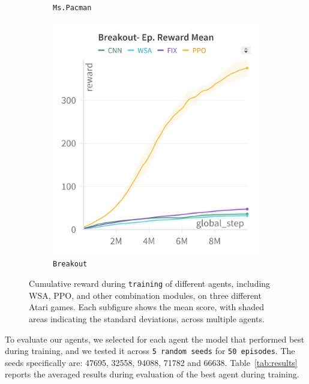 \begin{figure}[ht]
\begin{subfigure}[b]{0.32\textwidth}
        \caption{\texttt{Ms.Pacman}}
        \label{fig:mspacmantrain}
    \end{subfigure}
    \hfill
    \begin{subfigure}[b]{0.32\textwidth}
        \centering
        \includegraphics[width=\textwidth]{images/breakout_train}
        \caption{\texttt{Breakout}}
        \label{fig:breakouttrain}
    \end{subfigure}
    \caption{Cumulative reward during \texttt{training} of different agents, including WSA, PPO, and other combination modules, on three different Atari games. Each subfigure shows the mean score, with shaded areas indicating the standard deviations, across multiple agents.}
    \label{fig:trainresults}
\end{figure}


To evaluate our agents, we selected for each agent the model that performed best during training, and we tested it across \texttt{5 random seeds} for \texttt{50 episodes}.
The seeds specifically are: 47695, 32558, 94088, 71782 and 66638.
Table~\ref{tab:results} reports the averaged results during evaluation of the best agent during training.

